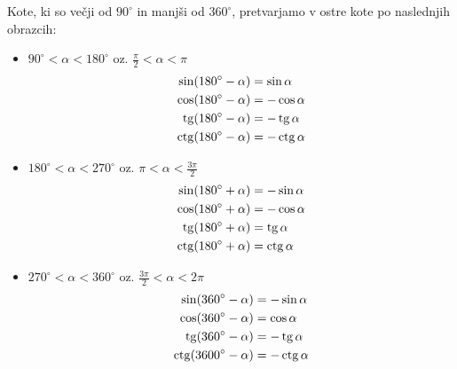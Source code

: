 Kote, ki so večji od $90^{\circ}$ in manjši od $360^{\circ}$, pretvarjamo v ostre kote po naslednjih obrazcih:
\begin{itemize}
\item $90^{\circ} <\alpha<180^{\circ}$ oz. $\frac{\pi}{2}<\alpha<\pi$
\begin{align*}
\sin(180^{\circ}-\alpha)&=\sin\alpha \\
\cos(180^{\circ}-\alpha)&=-\cos\alpha \\
\operatorname{tg}(180^{\circ}-\alpha) &=-\operatorname{tg}\alpha \\
\operatorname{ctg}(180^{\circ}-\alpha)&= -\operatorname{ctg}\alpha
\end{align*}

\item $180^{\circ} <\alpha<270^{\circ}$ oz. $\pi<\alpha<\frac{3\pi}{2}$
\begin{align*}
\sin(180^{\circ}+\alpha)&=-\sin\alpha \\
\cos(180^{\circ}+\alpha)&=-\cos\alpha \\
\operatorname{tg}(180^{\circ}+\alpha) &=\operatorname{tg}\alpha \\
\operatorname{ctg}(180^{\circ}+\alpha)&= \operatorname{ctg}\alpha
\end{align*}

\item $270^{\circ} <\alpha<360^{\circ}$ oz. $\frac{3\pi}{2}<\alpha<2\pi$
\begin{align*}
\sin(360^{\circ}-\alpha)&=-\sin\alpha \\
\cos(360^{\circ}-\alpha)&=\cos\alpha \\
\operatorname{tg}(360^{\circ}-\alpha) &=-\operatorname{tg}\alpha \\
\operatorname{ctg}(3600^{\circ}-\alpha)&=-\operatorname{ctg}\alpha
\end{align*}
\end{itemize}

